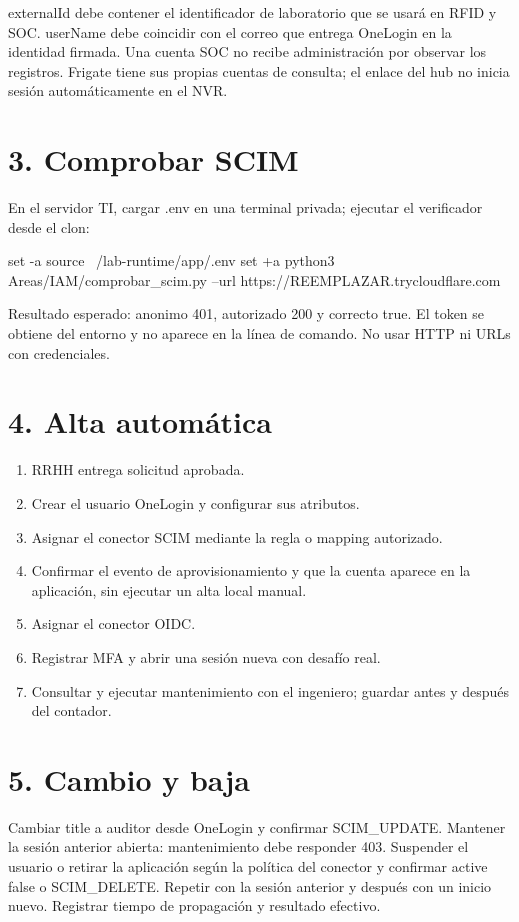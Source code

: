\documentclass[12pt,a4paper]{article}
\begin{document}
\textnormal{externalId} debe contener el identificador de laboratorio que se usará en RFID y SOC. \textnormal{userName} debe coincidir con el correo que entrega OneLogin en la identidad firmada. Una cuenta SOC no recibe administración por observar los registros. Frigate tiene sus propias cuentas de consulta; el enlace del hub no inicia sesión automáticamente en el NVR.\par
{}\section*{3. Comprobar SCIM}
En el servidor TI, cargar \textnormal{.env} en una terminal privada; ejecutar el verificador desde el clon:\par
{}
\begin{Comandos}
set -a
source ~/lab-runtime/app/.env
set +a
python3 Areas/IAM/comprobar_scim.py --url https://REEMPLAZAR.trycloudflare.com
\end{Comandos}
Resultado esperado: anonimo 401, autorizado 200 y correcto true. El token se obtiene del entorno y no aparece en la línea de comando. No usar HTTP ni URLs con credenciales.\par
{}\section*{4. Alta automática}
\begin{enumerate}
\item RRHH entrega solicitud aprobada.
\item Crear el usuario OneLogin y configurar sus atributos.
\item Asignar el conector SCIM mediante la regla o mapping autorizado.
\item Confirmar el evento de aprovisionamiento y que la cuenta aparece en la aplicación, sin ejecutar un alta local manual.
\item Asignar el conector OIDC.
\item Registrar MFA y abrir una sesión nueva con desafío real.
\item Consultar y ejecutar mantenimiento con el ingeniero; guardar antes y después del contador.
\end{enumerate}
\section*{5. Cambio y baja}
Cambiar title a auditor desde OneLogin y confirmar SCIM\_UPDATE. Mantener la sesión anterior abierta: mantenimiento debe responder 403. Suspender el usuario o retirar la aplicación según la política del conector y confirmar active false o SCIM\_DELETE. Repetir con la sesión anterior y después con un inicio nuevo. Registrar tiempo de propagación y resultado efectivo.\par
\end{document}
